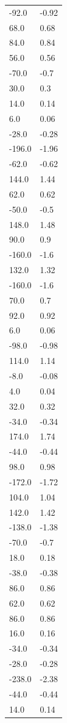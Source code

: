 \begin{longtable}{ll}
-92.0 & -0.92 \\
68.0 & 0.68 \\
84.0 & 0.84 \\
56.0 & 0.56 \\
-70.0 & -0.7 \\
30.0 & 0.3 \\
14.0 & 0.14 \\
6.0 & 0.06 \\
-28.0 & -0.28 \\
-196.0 & -1.96 \\
-62.0 & -0.62 \\
144.0 & 1.44 \\
62.0 & 0.62 \\
-50.0 & -0.5 \\
148.0 & 1.48 \\
90.0 & 0.9 \\
-160.0 & -1.6 \\
132.0 & 1.32 \\
-160.0 & -1.6 \\
70.0 & 0.7 \\
92.0 & 0.92 \\
6.0 & 0.06 \\
-98.0 & -0.98 \\
114.0 & 1.14 \\
-8.0 & -0.08 \\
4.0 & 0.04 \\
32.0 & 0.32 \\
-34.0 & -0.34 \\
174.0 & 1.74 \\
-44.0 & -0.44 \\
98.0 & 0.98 \\
-172.0 & -1.72 \\
104.0 & 1.04 \\
142.0 & 1.42 \\
-138.0 & -1.38 \\
-70.0 & -0.7 \\
18.0 & 0.18 \\
-38.0 & -0.38 \\
86.0 & 0.86 \\
62.0 & 0.62 \\
86.0 & 0.86 \\
16.0 & 0.16 \\
-34.0 & -0.34 \\
-28.0 & -0.28 \\
-238.0 & -2.38 \\
-44.0 & -0.44 \\
14.0 & 0.14 \\

\end{longtable}
